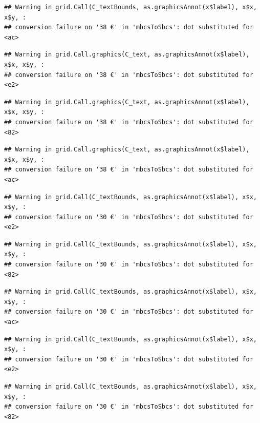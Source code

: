 \documentclass[
]{article}
\begin{document}
\begin{verbatim}
## Warning in grid.Call(C_textBounds, as.graphicsAnnot(x$label), x$x, x$y, :
## conversion failure on '38 €' in 'mbcsToSbcs': dot substituted for <ac>
\end{verbatim}

\begin{verbatim}
## Warning in grid.Call.graphics(C_text, as.graphicsAnnot(x$label), x$x, x$y, :
## conversion failure on '38 €' in 'mbcsToSbcs': dot substituted for <e2>
\end{verbatim}

\begin{verbatim}
## Warning in grid.Call.graphics(C_text, as.graphicsAnnot(x$label), x$x, x$y, :
## conversion failure on '38 €' in 'mbcsToSbcs': dot substituted for <82>
\end{verbatim}

\begin{verbatim}
## Warning in grid.Call.graphics(C_text, as.graphicsAnnot(x$label), x$x, x$y, :
## conversion failure on '38 €' in 'mbcsToSbcs': dot substituted for <ac>
\end{verbatim}

\begin{verbatim}
## Warning in grid.Call(C_textBounds, as.graphicsAnnot(x$label), x$x, x$y, :
## conversion failure on '30 €' in 'mbcsToSbcs': dot substituted for <e2>
\end{verbatim}

\begin{verbatim}
## Warning in grid.Call(C_textBounds, as.graphicsAnnot(x$label), x$x, x$y, :
## conversion failure on '30 €' in 'mbcsToSbcs': dot substituted for <82>
\end{verbatim}

\begin{verbatim}
## Warning in grid.Call(C_textBounds, as.graphicsAnnot(x$label), x$x, x$y, :
## conversion failure on '30 €' in 'mbcsToSbcs': dot substituted for <ac>
\end{verbatim}

\begin{verbatim}
## Warning in grid.Call(C_textBounds, as.graphicsAnnot(x$label), x$x, x$y, :
## conversion failure on '30 €' in 'mbcsToSbcs': dot substituted for <e2>
\end{verbatim}

\begin{verbatim}
## Warning in grid.Call(C_textBounds, as.graphicsAnnot(x$label), x$x, x$y, :
## conversion failure on '30 €' in 'mbcsToSbcs': dot substituted for <82>
\end{verbatim}
\end{document}
